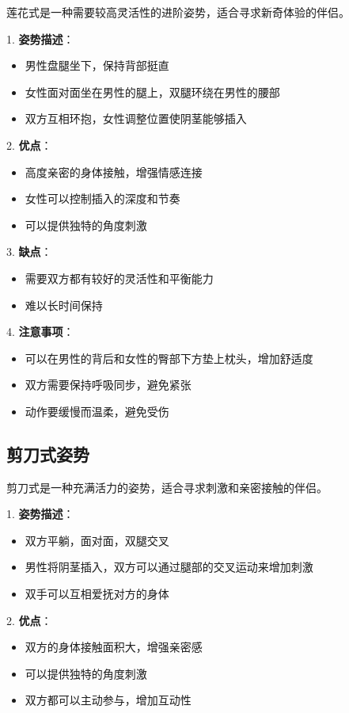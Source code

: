 \documentclass[12pt,UTF8]{ctexbook}
\begin{document}
莲花式是一种需要较高灵活性的进阶姿势，适合寻求新奇体验的伴侣。

1. \textbf{姿势描述}：
  \begin{itemize}
  \item 男性盘腿坐下，保持背部挺直
  \item 女性面对面坐在男性的腿上，双腿环绕在男性的腰部
  \item 双方互相环抱，女性调整位置使阴茎能够插入
  \end{itemize}

2. \textbf{优点}：
  \begin{itemize}
  \item 高度亲密的身体接触，增强情感连接
  \item 女性可以控制插入的深度和节奏
  \item 可以提供独特的角度刺激
  \end{itemize}

3. \textbf{缺点}：
  \begin{itemize}
  \item 需要双方都有较好的灵活性和平衡能力
  \item 难以长时间保持
  \end{itemize}

4. \textbf{注意事项}：
  \begin{itemize}
  \item 可以在男性的背后和女性的臀部下方垫上枕头，增加舒适度
  \item 双方需要保持呼吸同步，避免紧张
  \item 动作要缓慢而温柔，避免受伤
  \end{itemize}

\subsection{剪刀式姿势}

剪刀式是一种充满活力的姿势，适合寻求刺激和亲密接触的伴侣。

1. \textbf{姿势描述}：
  \begin{itemize}
  \item 双方平躺，面对面，双腿交叉
  \item 男性将阴茎插入，双方可以通过腿部的交叉运动来增加刺激
  \item 双手可以互相爱抚对方的身体
  \end{itemize}

2. \textbf{优点}：
  \begin{itemize}
  \item 双方的身体接触面积大，增强亲密感
  \item 可以提供独特的角度刺激
  \item 双方都可以主动参与，增加互动性
  \end{itemize}
\end{document}
